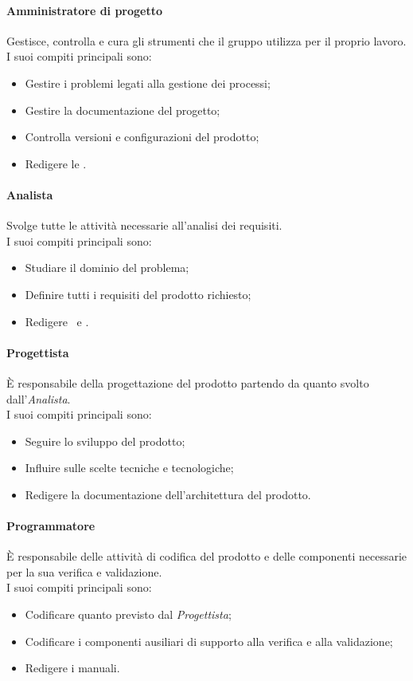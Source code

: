 \paragraph*{Amministratore di progetto}
Gestisce, controlla e cura gli strumenti che il gruppo utilizza per il proprio lavoro.\\
I suoi compiti principali sono:
\begin{itemize}
	\item Gestire i problemi legati alla gestione dei processi;
	\item Gestire la documentazione del progetto;
	\item Controlla versioni e configurazioni del prodotto;
	\item Redigere le {\NdP}.
\end{itemize}

\paragraph*{Analista}
Svolge tutte le attività necessarie all'analisi dei requisiti.\\
I suoi compiti principali sono:
\begin{itemize}
	\item Studiare il dominio del problema;
	\item Definire tutti i requisiti del prodotto richiesto;
	\item Redigere \SdFv\ e {\AdR}.
\end{itemize}

\paragraph*{Progettista}
È responsabile della progettazione del prodotto partendo da quanto svolto dall'\textit{Analista}.\\
I suoi compiti principali sono:
\begin{itemize}
	\item Seguire lo sviluppo del prodotto;
	\item Influire sulle scelte tecniche e tecnologiche;
	\item Redigere la documentazione dell'architettura del prodotto.
\end{itemize}

\paragraph*{Programmatore}
È responsabile delle attività di codifica del prodotto e delle componenti necessarie per la sua verifica e validazione.\\
I suoi compiti principali sono:
\begin{itemize}
	\item Codificare quanto previsto dal \textit{Progettista};
	\item Codificare i componenti ausiliari di supporto alla verifica e alla validazione;
	\item Redigere i manuali.
\end{itemize}

